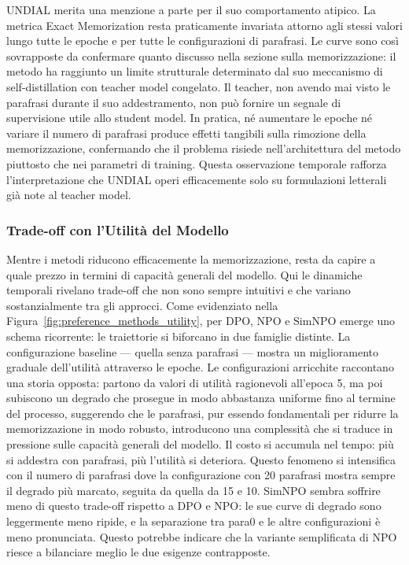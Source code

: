 UNDIAL merita una menzione a parte per il suo comportamento atipico. La metrica Exact Memorization resta praticamente invariata attorno agli stessi valori lungo tutte le epoche e per tutte le configurazioni di parafrasi. Le curve sono così sovrapposte da confermare quanto discusso nella sezione sulla memorizzazione: il metodo ha raggiunto un limite strutturale determinato dal suo meccanismo di self-distillation con teacher model congelato. Il teacher, non avendo mai visto le parafrasi durante il suo addestramento, non può fornire un segnale di supervisione utile allo student model. In pratica, né aumentare le epoche né variare il numero di parafrasi produce effetti tangibili sulla rimozione della memorizzazione, confermando che il problema risiede nell'architettura del metodo piuttosto che nei parametri di training. Questa osservazione temporale rafforza l'interpretazione che UNDIAL operi efficacemente solo su formulazioni letterali già note al teacher model.

\subsubsection{Trade-off con l'Utilità del Modello}

Mentre i metodi riducono efficacemente la memorizzazione, resta da capire a quale prezzo in termini di capacità generali del modello. Qui le dinamiche temporali rivelano trade-off che non sono sempre intuitivi e che variano sostanzialmente tra gli approcci.
Come evidenziato nella Figura~\ref{fig:preference_methods_utility}, per DPO, NPO e SimNPO emerge uno schema ricorrente: le traiettorie si biforcano in due famiglie distinte. La configurazione baseline — quella senza parafrasi — mostra un miglioramento graduale dell'utilità attraverso le epoche.
Le configurazioni arricchite raccontano una storia opposta: partono da valori di utilità ragionevoli all'epoca 5, ma poi subiscono un degrado che prosegue in modo abbastanza uniforme fino al termine del processo, suggerendo che le parafrasi, pur essendo fondamentali per ridurre la memorizzazione in modo robusto, introducono una complessità che si traduce in pressione sulle capacità generali del modello. Il costo si accumula nel tempo: più si addestra con parafrasi, più l'utilità si deteriora. Questo fenomeno si intensifica con il numero di parafrasi dove la configurazione con 20 parafrasi mostra sempre il degrado più marcato, seguita da quella da 15 e 10.
SimNPO sembra soffrire meno di questo trade-off rispetto a DPO e NPO: le sue curve di degrado sono leggermente meno ripide, e la separazione tra para0 e le altre configurazioni è meno pronunciata. Questo potrebbe indicare che la variante semplificata di NPO riesce a bilanciare meglio le due esigenze contrapposte.

